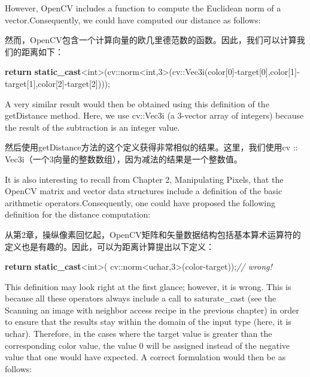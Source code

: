 \documentclass[]{article}
\newenvironment{Shaded}{}{}
\newcommand{\CommentTok}[1]{\textcolor[rgb]{0.38,0.63,0.69}{\textit{#1}}}
\newcommand{\ControlFlowTok}[1]{\textcolor[rgb]{0.00,0.44,0.13}{\textbf{#1}}}
\newcommand{\DataTypeTok}[1]{\textcolor[rgb]{0.56,0.13,0.00}{#1}}
\newcommand{\DecValTok}[1]{\textcolor[rgb]{0.25,0.63,0.44}{#1}}
\newcommand{\ExtensionTok}[1]{#1}
\newcommand{\KeywordTok}[1]{\textcolor[rgb]{0.00,0.44,0.13}{\textbf{#1}}}
\newcommand{\NormalTok}[1]{#1}
\begin{document}
However, OpenCV includes a function to compute the Euclidean norm of a
vector.Consequently, we could have computed our distance as follows:

然而，OpenCV包含一个计算向量的欧几里德范数的函数。因此，我们可以计算我们的距离如下：

\begin{Shaded}
\begin{Highlighting}[]
\ControlFlowTok{return} \KeywordTok{static_cast}\NormalTok{<}\DataTypeTok{int}\NormalTok{>(cv::norm<}\DataTypeTok{int}\NormalTok{,}\DecValTok{3}\NormalTok{>(cv::Vec3i(color[}\DecValTok{0}\NormalTok{]-target[}\DecValTok{0}\NormalTok{],color[}\DecValTok{1}\NormalTok{]-target[}\DecValTok{1}\NormalTok{],color[}\DecValTok{2}\NormalTok{]-target[}\DecValTok{2}\NormalTok{])));}
\end{Highlighting}
\end{Shaded}

A very similar result would then be obtained using this definition of
the getDistance method. Here, we use cv::Vec3i (a 3-vector array of
integers) because the result of the subtraction is an integer value.

然后使用getDistance方法的这个定义获得非常相似的结果。这里，我们使用cv ::
Vec3i（一个3向量的整数数组），因为减法的结果是一个整数值。

It is also interesting to recall from Chapter 2, Manipulating Pixels,
that the OpenCV matrix and vector data structures include a definition
of the basic arithmetic operators.Consequently, one could have proposed
the following definition for the distance computation:

从第2章，操纵像素回忆起，OpenCV矩阵和矢量数据结构包括基本算术运算符的定义也是有趣的。因此，可以为距离计算提出以下定义：

\begin{Shaded}
\begin{Highlighting}[]
\ControlFlowTok{return} \KeywordTok{static_cast}\NormalTok{<}\DataTypeTok{int}\NormalTok{>( cv::norm<}\ExtensionTok{uchar}\NormalTok{,}\DecValTok{3}\NormalTok{>(color-target));}\CommentTok{// wrong!}
\end{Highlighting}
\end{Shaded}

This definition may look right at the first glance; however, it is
wrong. This is because all these operators always include a call to
saturate\_cast (see the Scanning an image with neighbor access recipe in
the previous chapter) in order to ensure that the results stay within
the domain of the input type (here, it is uchar). Therefore, in the
cases where the target value is greater than the corresponding color
value, the value 0 will be assigned instead of the negative value that
one would have expected. A correct formulation would then be as follows:
\end{document}
